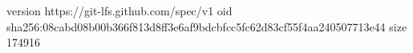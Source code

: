 version https://git-lfs.github.com/spec/v1
oid sha256:08cabd08b00b366f813d8ff3e6af9bdcbfcc5fc62d83cf55f4aa240507713e44
size 174916
